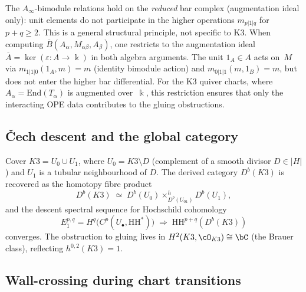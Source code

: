 \begin{remark}
\label{rem:reduced-bar-bimodule}
The $A_\infty$-bimodule relations hold on the \emph{reduced}
bar complex (augmentation ideal only): unit elements do not
participate in the higher operations $m_{p|1|q}$ for $p + q \geq 2$.
This is a general structural principle, not specific to K3.
When computing $\overline{B}(A_\alpha, M_{\alpha\beta}, A_\beta)$,
one restricts to the augmentation ideal
$\overline{A} = \ker(\varepsilon \colon A \to \Bbbk)$
in both algebra arguments. The unit $1_A \in A$ acts on~$M$
via $m_{1|1|0}(1_A, m) = m$ (identity bimodule action) and
$m_{0|1|1}(m, 1_B) = m$, but does not enter the higher bar
differential. For the K3 quiver charts, where
$A_\alpha = \mathrm{End}(T_\alpha)$ is augmented over~$\Bbbk$,
this restriction ensures that only the interacting OPE data
contributes to the gluing obstructions.
\end{remark}

\subsection{\v{C}ech descent and the global category}
\label{subsec:cech-descent}

\begin{theorem}
\label{thm:cech-descent}
Cover $K3 = U_0 \cup U_1$, where $U_0 = K3 \setminus D$
(complement of a smooth divisor $D \in |H|$) and $U_1$ is a
tubular neighbourhood of $D$. The derived category $D^b(K3)$
is recovered as the homotopy fibre product
\[
D^b(K3) \;\simeq\; D^b(U_0) \times^h_{D^b(U_{01})} D^b(U_1),
\]
and the descent spectral sequence for Hochschild cohomology
\[
E_1^{p,q} = H^q\bigl(C^p(U_\bullet, \mathrm{HH}^*)\bigr)
\;\Longrightarrow\; \mathrm{HH}^{p+q}(D^b(K3))
\]
converges. The obstruction to gluing lives in
$H^2(K3, \cO_{K3}) \cong \bC$ (the Brauer class), reflecting
$h^{0,2}(K3) = 1$.
\end{theorem}

\subsection{Wall-crossing during chart transitions}
\label{subsec:wallcrossing-charts}


